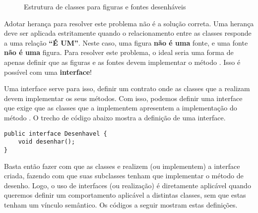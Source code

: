 \begin{figure}[h]
	\centering
	
	
	\caption{Estrutura de classes para figuras e fontes desenháveis}
	\label{fig:realizacao-figuras-fontes}
\end{figure}

Adotar herança para resolver este problema não é a solução correta. Uma herança deve ser aplicada estritamente quando o relacionamento entre as classes responde a uma relação \textbf{``É UM''}. Neste caso, uma figura \textbf{não é uma} fonte, e uma fonte \textbf{não é uma} figura. Para resolver este problema, o ideal seria uma forma de apenas definir que as figuras e as fontes devem implementar o método . Isso é possível com uma \textbf{interface}!

Uma interface serve para isso, definir um contrato onde as classes que a realizam devem implementar os seus métodos. Com isso, podemos definir uma interface  que exige que as classes que a implementem apresentem a implementação do método . O trecho de código abaixo mostra a definição de uma interface.

\begin{verbatim}
public interface Desenhavel {
	void desenhar();
}
\end{verbatim}

Basta então fazer com que as classes  e  realizem (ou implementem) a interface criada, fazendo com que suas subclasses tenham que implementar o método de desenho. Logo, o uso de interfaces (ou realização) é diretamente aplicável quando queremos definir um comportamento aplicável a distintas classes, sem que estas tenham um vínculo semântico. Os códigos a seguir mostram estas definições.

